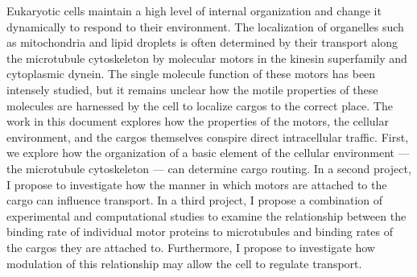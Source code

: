 \thesisabstract
{
  Eukaryotic cells maintain a high level of internal organization and change it dynamically to respond to their environment. The localization of organelles such as mitochondria and lipid droplets is often determined by their transport along the microtubule cytoskeleton by molecular motors in the kinesin superfamily and cytoplasmic dynein. The single molecule function of these motors has been intensely studied, but it remains unclear how the motile properties of these molecules are harnessed by the cell to localize cargos to the correct place. The work in this document explores how the properties of the motors, the cellular environment, and the cargos themselves conspire direct intracellular traffic. First, we explore how the organization of a basic element of the cellular environment --- the microtubule cytoskeleton --- can determine cargo routing. In a second project, I propose to investigate how the manner in which motors are attached to the cargo can influence transport. In a third project, I propose a combination of experimental and computational studies to examine the relationship between the binding rate of individual motor proteins to microtubules and binding rates of the cargos they are attached to. Furthermore, I propose to investigate how modulation of this relationship may allow the cell to regulate transport.
}

